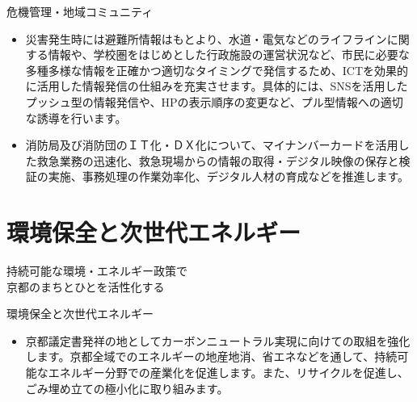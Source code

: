 \documentclass[dvipdfmx]{beamer}
\begin{document}
    \begin{frame}{危機管理・地域コミュニティ}{}
        \begin{small}
            \begin{itemize}
                \setlength{\itemsep}{2mm}
                \item 災害発生時には避難所情報はもとより、水道・電気などのライフラインに関する情報や、学校圏をはじめとした行政施設の運営状況など、市民に必要な多種多様な情報を正確かつ適切なタイミングで発信するため、ICTを効果的に活用した情報発信の仕組みを充実させます。具体的には、SNSを活用したプッシュ型の情報発信や、HPの表示順序の変更など、プル型情報への適切な誘導を行います。
                \item 消防局及び消防団のＩＴ化・ＤＸ化について、マイナンバーカードを活用した救急業務の迅速化、救急現場からの情報の取得・デジタル映像の保存と検証の実施、事務処理の作業効率化、デジタル人材の育成などを推進します。
            \end{itemize}
        \end{small}
    \end{frame}

\section{環境保全と次世代エネルギー}
    \begin{frame}{}{}
        \sectionpage
        \begin{center}
            \begin{large}
                \alert{持続可能な環境・エネルギー政策で}\\\alert{京都のまちとひとを活性化する}
            \end{large}
        \end{center}
    \end{frame}

    \begin{frame}{環境保全と次世代エネルギー}{}
        \begin{small}
            \begin{itemize}
                \setlength{\itemsep}{2mm}
                \item 京都議定書発祥の地としてカーボンニュートラル実現に向けての取組を強化します。京都全域でのエネルギーの地産地消、省エネなどを通して、持続可能なエネルギー分野での産業化を促進します。また、リサイクルを促進し、ごみ埋め立ての極小化に取り組みます。
            \end{itemize}
        \end{small}
    \end{frame}
\end{document}
